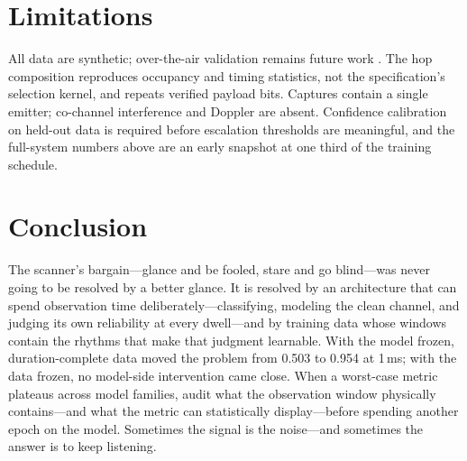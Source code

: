 \documentclass[10pt,twocolumn]{article}
\begin{document}
\section{Limitations}\label{sec:lim}
All data are synthetic; over-the-air validation remains future work
\cite{oshea2018}. The hop composition reproduces occupancy and timing
statistics, not the specification's selection kernel, and repeats verified
payload bits. Captures contain a single emitter; co-channel interference
and Doppler are absent. Confidence calibration \cite{guo2017} on held-out
data is required before escalation thresholds are meaningful, and the
full-system numbers above are an early snapshot at one third of the
training schedule.

\section{Conclusion}
The scanner's bargain---glance and be fooled, stare and go blind---was
never going to be resolved by a better glance. It is resolved by an architecture that can spend observation time
deliberately---classifying, modeling the clean channel, and judging its
own reliability at every dwell---and by training data whose windows
contain the rhythms that make that judgment learnable. With the model
frozen, duration-complete data moved the problem from 0.503 to 0.954 at
1\,ms; with the data frozen, no model-side intervention came close. When a
worst-case metric plateaus across model families, audit what the
observation window physically contains---and what the metric can
statistically display---before spending another epoch on the model.
Sometimes the signal is the noise---and sometimes the answer is to keep
listening.
\end{document}
